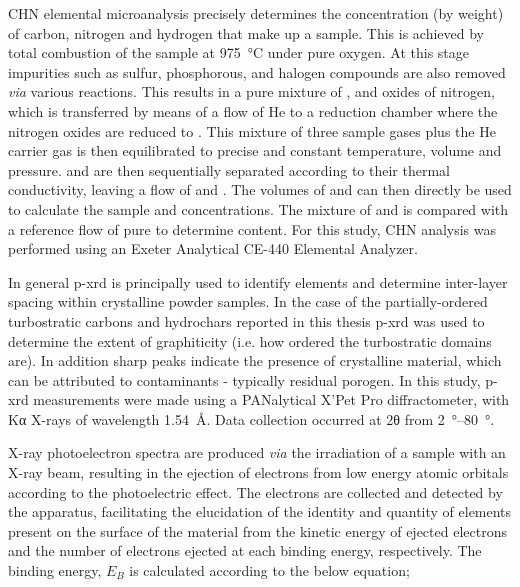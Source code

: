 CHN elemental microanalysis precisely determines the concentration (by weight) of carbon, nitrogen and hydrogen that make up a sample. This is achieved by total combustion of the sample at \qty{975}{\degreeCelsius} under pure oxygen. At this stage impurities such as sulfur, phosphorous, and halogen compounds are also removed \textit{via} various reactions. This results in a pure mixture of ,  and oxides of nitrogen, which is transferred by means of a flow of He to a reduction chamber where the nitrogen oxides are reduced to . This mixture of three sample gases plus the He carrier gas is then equilibrated to precise and constant temperature, volume and pressure.  and  are then sequentially separated according to their thermal conductivity, leaving a flow of  and . The volumes of  and  can then directly be used to calculate the sample  and  concentrations. The mixture of  and  is compared with a reference flow of pure  to determine  content. For this study, CHN analysis was performed using an Exeter Analytical CE-440 Elemental Analyzer.

In general \acrfull{p-xrd} is principally used to identify elements and determine inter-layer spacing within crystalline powder samples. In the case of the partially-ordered \glspl{turbostratic carbon} and \glspl{hydrochar} reported in this thesis \acrshort{p-xrd} was used to determine the extent of graphiticity (i.e. how ordered the turbostratic domains are). In addition sharp peaks indicate the presence of crystalline material, which can be attributed to contaminants - typically residual \gls{porogen}. In this study, \acrshort{p-xrd} measurements were made using a PANalytical X’Pet Pro diffractometer, with K\textgreek{α} X-rays of wavelength \qty{1.54}{\angstrom}. Data collection occurred at 2\textgreek{θ} from \qtyrange[range-units=single]{2}{80}{\degree}.

X-ray photoelectron spectra are produced \textit{via} the irradiation of a sample with an X-ray beam, resulting in the ejection of electrons from low energy atomic orbitals according to the photoelectric effect\citep{richardson1912liii}. The electrons are collected and detected by the apparatus, facilitating the elucidation of the identity and quantity of elements present on the surface of the material from the kinetic energy of ejected electrons and the number of electrons ejected at each binding energy, respectively. The binding energy, $E_B$ is calculated according to the below equation;

